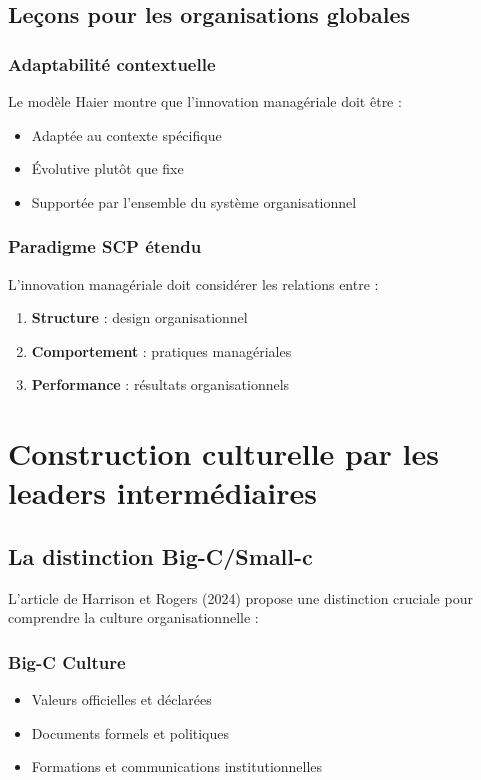 \documentclass[12pt,a4paper]{article}
\begin{document}
\subsection{Leçons pour les organisations globales}

\subsubsection{Adaptabilité contextuelle}
Le modèle Haier montre que l'innovation managériale doit être :
\begin{itemize}
    \item Adaptée au contexte spécifique
    \item Évolutive plutôt que fixe
    \item Supportée par l'ensemble du système organisationnel
\end{itemize}

\subsubsection{Paradigme SCP étendu}
L'innovation managériale doit considérer les relations entre :
\begin{enumerate}
    \item \textbf{Structure} : design organisationnel
    \item \textbf{Comportement} : pratiques managériales
    \item \textbf{Performance} : résultats organisationnels
\end{enumerate}

\section{Construction culturelle par les leaders intermédiaires}

\subsection{La distinction Big-C/Small-c}

L'article de Harrison et Rogers (2024) propose une distinction cruciale pour comprendre la culture organisationnelle :

\subsubsection{Big-C Culture}
\begin{itemize}
    \item Valeurs officielles et déclarées
    \item Documents formels et politiques
    \item Formations et communications institutionnelles
\end{itemize}
\end{document}
